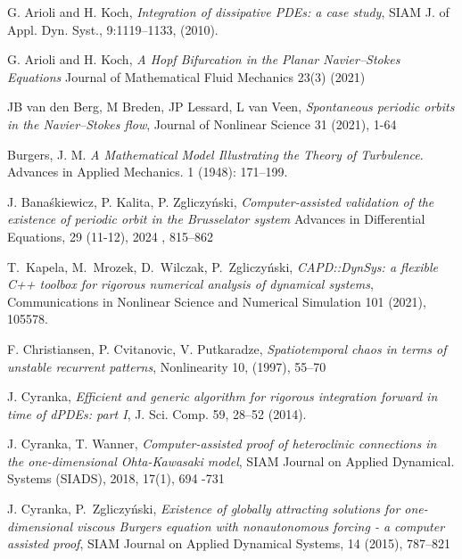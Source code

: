 
\begin{thebibliography}{HNW00}

   G. Arioli and H. Koch,  \emph{Integration of dissipative PDEs: a case study}, SIAM J. of Appl. Dyn. Syst.,
9:1119–1133, (2010).

   G. Arioli and H. Koch, \emph{A Hopf Bifurcation in the Planar Navier–Stokes Equations}
Journal of Mathematical Fluid Mechanics 23(3) (2021)



JB van den Berg, M Breden, JP Lessard, L van Veen,  \emph{Spontaneous periodic orbits in the Navier–Stokes flow},
Journal of Nonlinear Science 31 (2021), 1-64


 Burgers, J. M. \emph{A Mathematical Model Illustrating the Theory of Turbulence}. Advances in Applied Mechanics. 1 (1948): 171–199.

 J. Bana{\'s}kiewicz, P. Kalita, P. Zgliczy{\'n}ski, \emph{Computer-assisted validation of the existence of periodic orbit in the Brusselator system}
  Advances in Differential Equations, 29 (11-12), 2024 , 815--862

 T.~Kapela, M.~Mrozek, D.~Wilczak, P.~Zgliczy\'nski, \emph{{CAPD::DynSys:} a flexible
{C}++ toolbox for rigorous numerical analysis of dynamical systems},
Communications in Nonlinear Science and Numerical Simulation 101 (2021), 105578.



 F. Christiansen, P. Cvitanovic, V. Putkaradze,
\emph{Spatiotemporal chaos in terms of unstable recurrent patterns}, Nonlinearity 10, (1997), 55--70

 J. Cyranka, \emph{Efficient and generic algorithm for rigorous integration forward in time of dPDEs: part I}, J. Sci. Comp. 59, 28--52 (2014).


 J. Cyranka, T. Wanner, \emph{Computer-assisted proof of heteroclinic connections in the one-dimensional Ohta-Kawasaki model}, SIAM Journal on Applied Dynamical. Systems (SIADS), 2018, 17(1), 694 -731

 J. Cyranka,  P.~Zgliczy\'nski, \emph{Existence of globally attracting  solutions for
one-dimensional viscous Burgers equation with nonautonomous
forcing - a computer assisted proof}, SIAM Journal on
Applied Dynamical Systems, 14 (2015), 787--821




\end{thebibliography}
